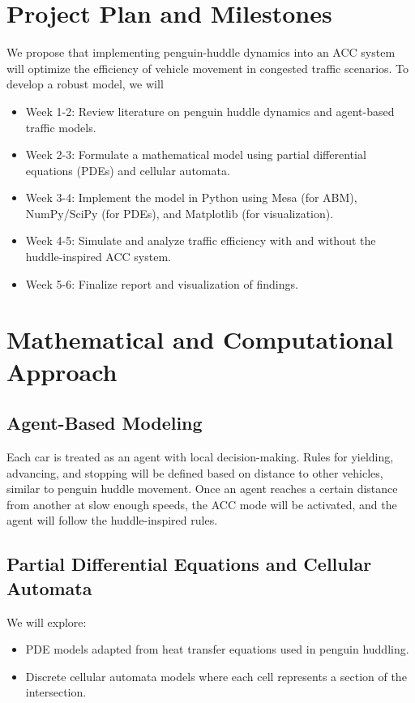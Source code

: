 \documentclass[10pt]{article}
\begin{document}
\section*{Project Plan and Milestones}
We propose that implementing penguin-huddle dynamics into an ACC system will optimize the efficiency of vehicle movement in congested traffic scenarios.
 To develop a robust model, we will

\begin{itemize}
    \item Week 1-2: Review literature on penguin huddle dynamics and agent-based traffic models.
    \item Week 2-3: Formulate a mathematical model using partial differential equations (PDEs) and cellular automata.
    \item Week 3-4: Implement the model in Python using Mesa (for ABM), NumPy/SciPy (for PDEs), and Matplotlib (for visualization).
    \item Week 4-5: Simulate and analyze traffic efficiency with and without the huddle-inspired ACC system.
    \item Week 5-6: Finalize report and visualization of findings.
\end{itemize}

\section*{Mathematical and Computational Approach}

\subsection*{Agent-Based Modeling}
    Each car is treated as an agent with local decision-making. Rules for yielding, advancing, and stopping will be defined based on distance to other vehicles, similar to penguin huddle movement.
Once an agent reaches a certain distance from another at slow enough speeds, the ACC mode will be activated, and the agent will follow the huddle-inspired rules.

\subsection*{Partial Differential Equations and Cellular Automata}
We will explore:
\begin{itemize}
    \item PDE models adapted from heat transfer equations used in penguin huddling.
    \item Discrete cellular automata models where each cell represents a section of the intersection.
\end{itemize}
\end{document}
